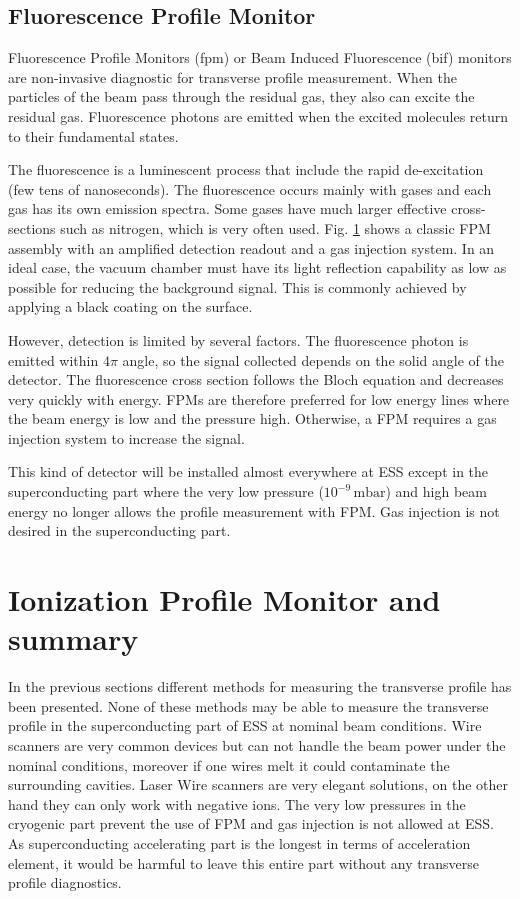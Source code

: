 \begin{refsection}
  \subsection{Fluorescence Profile Monitor}
  Fluorescence Profile Monitors (\acrshort{fpm}) or Beam Induced Fluorescence (\acrshort{bif}) monitors are non-invasive diagnostic for transverse profile measurement. When the particles of the beam pass through the residual gas, they also can excite the residual gas. Fluorescence photons are emitted when the excited molecules return to their fundamental states.

  The fluorescence is a luminescent process that include the rapid  de-excitation (few tens of nanoseconds). The fluorescence occurs mainly with gases and each gas has its own emission spectra. Some gases have much larger effective cross-sections such as nitrogen, which is very often used. Fig. \ref{} shows a classic FPM assembly with an amplified detection readout and a gas injection system. In an ideal case, the vacuum chamber must have its light reflection capability as low as possible for reducing the background signal. This is commonly achieved by applying a black coating on the surface.

  However, detection is limited by several factors. The fluorescence photon is emitted within $4\pi$ angle, so the signal collected depends on the solid angle of the detector. The fluorescence cross section follows the Bloch equation and decreases very quickly with energy. FPMs are therefore preferred for low energy lines where the beam energy is low and the pressure high.  Otherwise, a FPM requires a gas injection system to increase the signal.

  This kind of detector will be installed almost everywhere at ESS except in the superconducting part where the very low pressure ($10^{-9}\,\mathrm{mbar}$)  and high beam energy no longer allows the profile measurement with FPM. Gas injection is not desired in the superconducting part.

  \section{Ionization Profile Monitor and summary}
  In the previous sections different methods for measuring the transverse profile has been presented. None of these methods may be able to measure the transverse profile in the superconducting part of ESS at nominal beam conditions. Wire scanners are very common devices but can not handle the beam power under the nominal conditions, moreover if one wires melt it could contaminate the surrounding cavities. Laser Wire scanners are very elegant solutions, on the other hand they can only work with negative ions. The very low pressures in the cryogenic part prevent the use of FPM and gas injection is not allowed at ESS.
  As superconducting accelerating part is the longest in terms of acceleration element, it would be harmful to leave this entire part without any transverse profile diagnostics.


\end{refsection}
